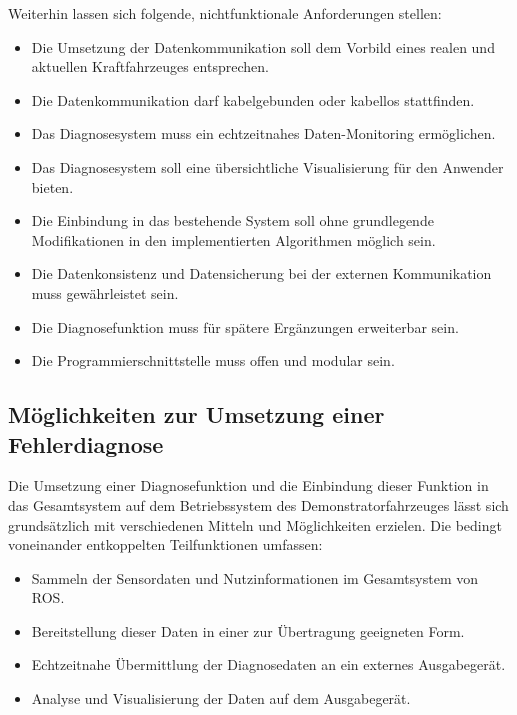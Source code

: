 Weiterhin lassen sich folgende, nichtfunktionale Anforderungen stellen:
\begin{itemize}
	\item Die Umsetzung der Datenkommunikation soll dem Vorbild eines realen und aktuellen Kraftfahrzeuges entsprechen.
	\item Die Datenkommunikation darf kabelgebunden oder kabellos stattfinden.
	\item Das Diagnosesystem muss ein echtzeitnahes Daten-Monitoring ermöglichen.
	\item Das Diagnosesystem soll eine übersichtliche Visualisierung für den Anwender bieten. 
	\item Die Einbindung in das bestehende System soll ohne grundlegende Modifikationen in den implementierten Algorithmen möglich sein.
	\item Die Datenkonsistenz und Datensicherung bei der externen Kommunikation muss gewährleistet sein.
	\item Die Diagnosefunktion muss für spätere Ergänzungen erweiterbar sein.
	\item Die Programmierschnittstelle muss offen und modular sein. 
\end{itemize}


\subsection{Möglichkeiten zur Umsetzung einer Fehlerdiagnose}
\label{subsec:MöglichkeitenDiagnose}

Die Umsetzung einer Diagnosefunktion und die Einbindung dieser Funktion in das Gesamtsystem auf dem Betriebssystem des Demonstratorfahrzeuges lässt sich grundsätzlich mit verschiedenen Mitteln und Möglichkeiten erzielen. Die bedingt voneinander entkoppelten Teilfunktionen umfassen:
\begin{itemize}
	\item Sammeln der Sensordaten und Nutzinformationen im Gesamtsystem von ROS.
	\item Bereitstellung dieser Daten in einer zur Übertragung geeigneten Form.
	\item Echtzeitnahe Übermittlung der Diagnosedaten an ein externes Ausgabegerät.
	\item Analyse und Visualisierung der Daten auf dem Ausgabegerät. 
\end{itemize}

